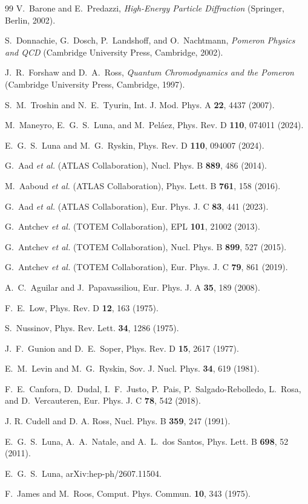 \documentclass[aps,prd,twocolumn,superscriptaddress,longbibliography,nofootinbib]{revtex4-2}
\begin{document}
\begin{thebibliography}{99}
 V.~Barone and E.~Predazzi, {\it High-Energy Particle Diffraction} (Springer, Berlin, 2002).

 S.~Donnachie, G.~Dosch, P.~Landshoff, and O.~Nachtmann, {\it Pomeron Physics and QCD} (Cambridge University Press, Cambridge, 2002).

 J.~R.~Forshaw and D.~A.~Ross, {\it Quantum Chromodynamics and the Pomeron} (Cambridge University Press, Cambridge, 1997).

 S.~M.~Troshin and N.~E.~Tyurin, Int. J. Mod. Phys. A \textbf{22}, 4437 (2007).

 M.~Maneyro, E.~G.~S.~Luna, and M.~Pel\'aez, Phys. Rev. D \textbf{110}, 074011 (2024).

 E.~G.~S.~Luna and M.~G.~Ryskin, Phys. Rev. D \textbf{110}, 094007 (2024).

 G.~Aad {\it et al.} (ATLAS Collaboration), Nucl. Phys. B \textbf{889}, 486 (2014).

 M.~Aaboud {\it et al.} (ATLAS Collaboration), Phys. Lett. B \textbf{761}, 158 (2016).

 G.~Aad {\it et al.} (ATLAS Collaboration), Eur. Phys. J. C \textbf{83}, 441 (2023).

 G.~Antchev {\it et al.} (TOTEM Collaboration), EPL \textbf{101}, 21002 (2013).

 G.~Antchev {\it et al.} (TOTEM Collaboration), Nucl. Phys. B \textbf{899}, 527 (2015).

 G.~Antchev {\it et al.} (TOTEM Collaboration), Eur. Phys. J. C \textbf{79}, 861 (2019).

 A.~C.~Aguilar and J.~Papavassiliou, Eur. Phys. J. A \textbf{35}, 189 (2008).

 F.~E.~Low, Phys. Rev. D \textbf{12}, 163 (1975).

 S.~Nussinov, Phys. Rev. Lett. \textbf{34}, 1286 (1975).

 J.~F.~Gunion and D.~E.~Soper, Phys. Rev. D \textbf{15}, 2617 (1977).

 E.~M.~Levin and M.~G.~Ryskin, Sov. J. Nucl. Phys. \textbf{34}, 619 (1981).

 F.~E.~Canfora, D.~Dudal, I.~F.~Justo, P.~Pais, P.~Salgado-Rebolledo, L.~Rosa, and D.~Vercauteren, Eur. Phys. J. C \textbf{78}, 542 (2018).

 J. R. Cudell and D. A. Ross, Nucl. Phys. B \textbf{359}, 247 (1991).  

 E.~G.~S.~Luna, A.~A.~Natale, and A.~L.~dos Santos, Phys. Lett. B \textbf{698}, 52 (2011).

 E.~G.~S.~Luna, arXiv:hep-ph/2607.11504.  

 F.~James and M.~Roos, Comput. Phys. Commun. \textbf{10}, 343 (1975).

\end{thebibliography}
\end{document}
